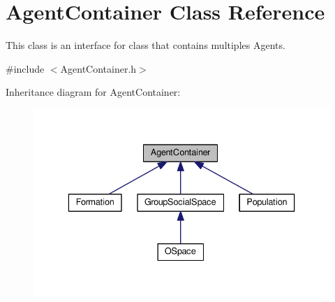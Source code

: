 \hypertarget{classAgentContainer}{}\section{Agent\+Container Class Reference}
\label{classAgentContainer}


This class is an interface for class that contains multiples Agents.  




{\ttfamily \#include $<$Agent\+Container.\+h$>$}



Inheritance diagram for Agent\+Container\+:\nopagebreak
\begin{figure}[H]
\begin{center}
\leavevmode
\includegraphics[width=336pt]{classAgentContainer__inherit__graph}
\end{center}
\end{figure}

